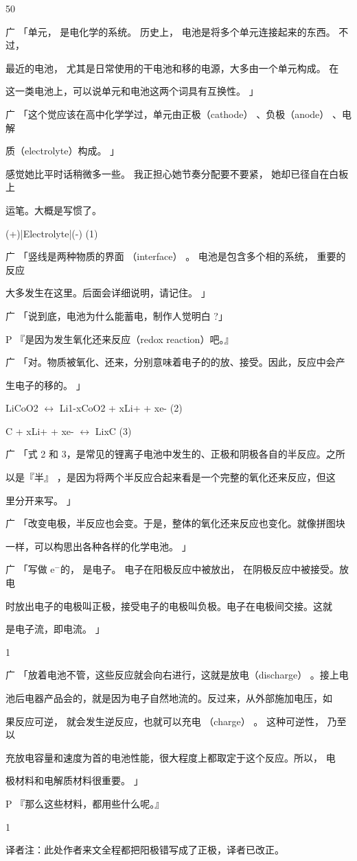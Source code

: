 50\par
广 「单元， 是电化学的系统。 历史上， 电池是将多个单元连接起来的东西。 不过，\par
最近的电池， 尤其是日常使用的干电池和移的电源，大多由一个单元构成。 在\par
这一类电池上，可以说单元和电池这两个词具有互换性。 」\par
广 「这个觉应该在高中化学学过，单元由正极（cathode） 、负极（anode） 、电解\par
质（electrolyte）构成。 」\par
感觉她比平时话稍微多一些。 我正担心她节奏分配要不要紧， 她却已径自在白板上\par
运笔。大概是写惯了。\par
(+)|Electrolyte|(-) (1)\par
广 「竖线是两种物质的界面 （interface） 。 电池是包含多个相的系统， 重要的反应\par
大多发生在这里。后面会详细说明，请记住。 」\par
广 「说到底，电池为什么能蓄电，制作人觉明白 ?」\par
P 『是因为发生氧化还来反应（redox reaction）吧。』\par
广 「对。物质被氧化、还来，分别意味着电子的的放、接受。因此，反应中会产\par
生电子的移的。 」\par
LiCoO2 $\leftrightarrow$ Li1-xCoO2 + xLi+ + xe- (2)\par
C + xLi+ + xe- $\leftrightarrow$ LixC (3)\par
广 「式 2 和 3，是常见的锂离子电池中发生的、正极和阴极各自的半反应。之所\par
以是『半』 ，是因为将两个半反应合起来看是一个完整的氧化还来反应，但这\par
里分开来写。 」\par
广 「改变电极，半反应也会变。于是，整体的氧化还来反应也变化。就像拼图块\par
一样，可以构思出各种各样的化学电池。 」\par
广 「写做 e$^{-}$的， 是电子。 电子在阳极反应中被放出， 在阴极反应中被接受。放电\par
时放出电子的电极叫正极，接受电子的电极叫负极。电子在电极间交接。这就\par
是电子流，即电流。 」\par
1\par
广 「放着电池不管，这些反应就会向右进行，这就是放电（discharge） 。接上电\par
池后电器产品会的，就是因为电子自然地流的。反过来，从外部施加电压，如\par
果反应可逆， 就会发生逆反应，也就可以充电 （charge） 。 这种可逆性， 乃至以\par
充放电容量和速度为首的电池性能，很大程度上都取定于这个反应。所以， 电\par
极材料和电解质材料很重要。 」\par
P 『那么这些材料，都用些什么呢。』\par
1\par
译者注：此处作者来文全程都把阳极错写成了正极，译者已改正。\par

